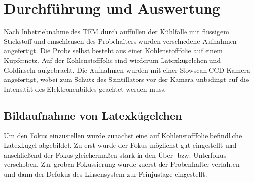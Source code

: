 \documentclass[slug=TEM, room=IFW, supervisor=?, coursedate=23.\ 01.\ 2020]{../../Lab_Report_LaTeX/lab_report}
\begin{document}
\section{Durchf\"uhrung und Auswertung}
\label{sec:durchaus}


Nach Inbetriebnahme des TEM durch auff\"ullen der K\"uhlfalle mit
fl\"ussigem Stickstoff und einschleusen des Probehalters wurden
verschiedene Aufnahmen angefertigt.
Die Probe selbst besteht aus einer Kohlenstofffolie auf einem
Kupfernetz. Auf der Kohlenstofffolie sind wiederum Latexk\"ugelchen und
Goldinseln aufgebracht.
Die Aufnahmen wurden mit einer Slowscan-CCD Kamera angefertigt,
wobei zum Schutz des Szintillators vor der Kamera unbedingt auf die
Intensität des Elektronenbildes geachtet werden muss.

\subsection{Bildaufnahme von Latexkügelchen}
\label{sec:latex}

Um den Fokus einzustellen wurde zunächst eine auf Kohlenstofffolie
befindliche Latexkugel abgebildet. Zu erst wurde der Fokus möglichst
gut eingestellt und anschließend der Fokus gleichermaßen stark in den
Über- bzw. Unterfokus verschoben. Zur groben Fokussierung wurde zuerst
der Probenhalter verfahren und dann der Defokus des Linsensystem zur
Feinjustage eingestellt.
\end{document}
